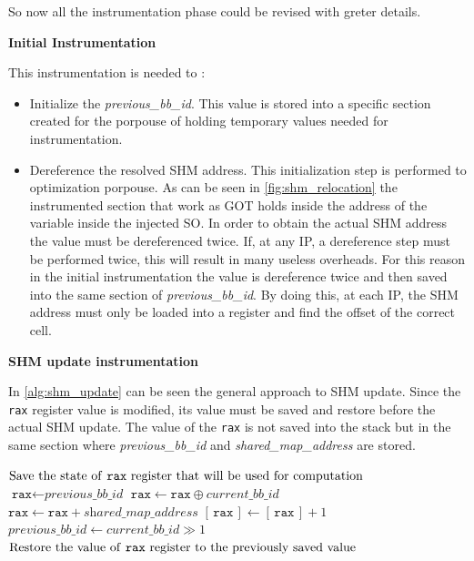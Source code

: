 So now all the instrumentation phase could be revised with greter details.
\begin{center}
    \textbf{Initial Instrumentation}
\end{center}
This instrumentation is needed to :
\begin{itemize}
    \item Initialize the \textit{previous\_bb\_id}. This value is stored into a specific section created for the porpouse of 
        holding temporary values needed for instrumentation.
    \item Dereference the resolved \gls{SHM} address. This initialization step is performed to optimization porpouse. 
        As can be seen in \cref{fig:shm_relocation} the instrumented section that work as \gls{GOT} holds inside the address 
        of the variable inside the injected \gls{SO}. In order to obtain the actual \gls{SHM} address the value must be dereferenced twice. 
        If, at any \gls{IP}, a dereference step must be performed twice, this will result in many useless overheads.
        For this reason in the initial instrumentation the value is dereference twice and then saved into the same section of \textit{previous\_bb\_id}.
        By doing this, at each \gls{IP}, the \gls{SHM} address must only be loaded into a register and find the offset of the correct cell.
\end{itemize}
\begin{center}
    \textbf{\gls{SHM} update instrumentation}
\end{center}
In \cref{alg:shm_update} can be seen the general approach to \gls{SHM} update.
Since the \texttt{rax} register value is modified, its value must be saved and restore before the actual \gls{SHM} update.
The value of the \texttt{rax} is not saved into the stack but in the same section where \textit{previous\_bb\_id} and 
\textit{shared\_map\_address} are stored.
\begin{algorithm}
    \caption{Pseudo-code of Shared Memory update instrumentation}
    \label{alg:shm_update}
    \begin{algorithmic}[1]
        \STATE $\text{Save the state of \texttt{rax} register that will be used for computation}$
        \STATE $\texttt{rax} \gets \textit{previous\_bb\_id}$
        \STATE $\texttt{rax} \gets \texttt{rax} \oplus \textit{current\_bb\_id}$ 
        \STATE $\texttt{rax} \gets \texttt{rax} + \textit{shared\_map\_address} $\COMMENT{\small \textcolor{green!60!black}{since the shared map is an array, the offset is obtained adding the initial address plus the index}}
        \STATE $[\,\texttt{rax}\,] \gets [\,\texttt{rax}\,] + 1$ \COMMENT{\small \textcolor{green!60!black}{the [\,\,] is the dereference operator}}
        \STATE $\textit{previous\_bb\_id} \gets \textit{current\_bb\_id} \gg 1$
        \STATE $\text{Restore the value of \texttt{rax} register to the previously saved value}$
    \end{algorithmic}
\end{algorithm}

